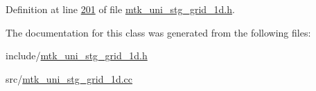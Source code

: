 Definition at line \hyperlink{mtk__uni__stg__grid__1d_8h_source_l00201}{201} of file \hyperlink{mtk__uni__stg__grid__1d_8h_source}{mtk\+\_\+uni\+\_\+stg\+\_\+grid\+\_\+1d.\+h}.



The documentation for this class was generated from the following files\+:\begin{DoxyCompactItemize}
\item 
include/\hyperlink{mtk__uni__stg__grid__1d_8h}{mtk\+\_\+uni\+\_\+stg\+\_\+grid\+\_\+1d.\+h}\item 
src/\hyperlink{mtk__uni__stg__grid__1d_8cc}{mtk\+\_\+uni\+\_\+stg\+\_\+grid\+\_\+1d.\+cc}\end{DoxyCompactItemize}
